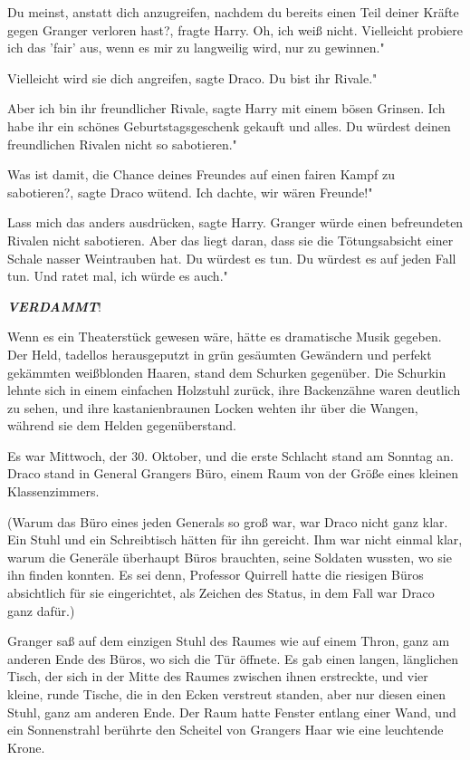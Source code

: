 \glqq Du meinst, anstatt dich anzugreifen, nachdem du bereits einen Teil deiner
Kräfte gegen Granger verloren hast?\grqq{}, fragte Harry. \glqq Oh, ich weiß
nicht. Vielleicht probiere ich das 'fair' aus, wenn es mir zu langweilig wird,
nur zu gewinnen."

\glqq Vielleicht wird sie dich angreifen\grqq{}, sagte Draco. \glqq Du bist ihr
Rivale."

\glqq Aber ich bin ihr freundlicher Rivale\grqq{}, sagte Harry mit einem bösen
Grinsen. \glqq Ich habe ihr ein schönes Geburtstagsgeschenk gekauft und alles.
Du würdest deinen freundlichen Rivalen nicht so sabotieren."

\glqq Was ist damit, die Chance deines Freundes auf einen fairen Kampf zu
sabotieren?\grqq{}, sagte Draco wütend. \glqq Ich dachte, wir wären Freunde!"

\glqq Lass mich das anders ausdrücken\grqq{}, sagte Harry. \glqq Granger würde
einen befreundeten Rivalen nicht sabotieren. Aber das liegt daran, dass sie die
Tötungsabsicht einer Schale nasser Weintrauben hat. Du würdest es tun. Du
würdest es auf jeden Fall tun. Und ratet mal, ich würde es auch."

\textbf{\emph{VERDAMMT}}!


Wenn es ein Theaterstück gewesen wäre, hätte es dramatische Musik gegeben. Der
Held, tadellos herausgeputzt in grün gesäumten Gewändern und perfekt gekämmten
weißblonden Haaren, stand dem Schurken gegenüber. Die Schurkin lehnte sich in
einem einfachen Holzstuhl zurück, ihre Backenzähne waren deutlich zu sehen, und
ihre kastanienbraunen Locken wehten ihr über die Wangen, während sie dem Helden
gegenüberstand.

Es war Mittwoch, der 30. Oktober, und die erste Schlacht stand am Sonntag an.
Draco stand in General Grangers Büro, einem Raum von der Größe eines kleinen
Klassenzimmers.

(Warum das Büro eines jeden Generals so groß war, war Draco nicht ganz klar. Ein
Stuhl und ein Schreibtisch hätten für ihn gereicht. Ihm war nicht einmal klar,
warum die Generäle überhaupt Büros brauchten, seine Soldaten wussten, wo sie ihn
finden konnten. Es sei denn, Professor Quirrell hatte die riesigen Büros
absichtlich für sie eingerichtet, als Zeichen des Status, in dem Fall war Draco
ganz dafür.)

Granger saß auf dem einzigen Stuhl des Raumes wie auf einem Thron, ganz am
anderen Ende des Büros, wo sich die Tür öffnete. Es gab einen langen, länglichen
Tisch, der sich in der Mitte des Raumes zwischen ihnen erstreckte, und vier
kleine, runde Tische, die in den Ecken verstreut standen, aber nur diesen einen
Stuhl, ganz am anderen Ende. Der Raum hatte Fenster entlang einer Wand, und ein
Sonnenstrahl berührte den Scheitel von Grangers Haar wie eine leuchtende Krone.

